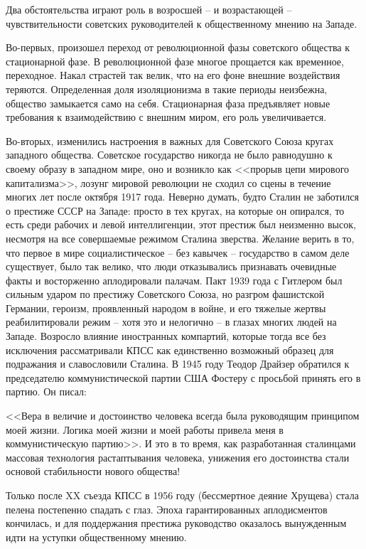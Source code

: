 \documentclass{book}
\begin{document}
Два обстоятельства играют роль в возросшей -- и возрас­тающей -- чувствительности советских руководителей к общест­венному мнению на Западе.

Во-первых, произошел переход от революционной фазы советского общества к стационарной фазе. В революционной фазе многое прощается как временное, переходное. Накал страстей так велик, что на его фоне внешние воздействия теря­ются. Определенная доля изоляционизма в такие периоды неизбежна, общество замыкается само на себя. Стационарная фаза предъявляет новые требования к взаимодействию с внеш­ним миром, его роль увеличивается.

Во-вторых, изменились настроения в важных для Советско­го Союза кругах западного общества. Советское государство никогда не было равнодушно к своему образу в западном ми­ре, оно и возникло как <<прорыв цепи мирового капитализма>>, лозунг мировой революции не сходил со сцены в течение многих лет после октября 1917 года. Неверно думать, будто Сталин не заботился о престиже СССР на Западе: просто в тех кругах, на которые он опирался, то есть среди рабочих и левой интел­лигенции, этот престиж был неизменно высок, несмотря на все совершаемые режимом Сталина зверства. Желание верить в то, что первое в мире социалистическое -- без кавычек -- го­сударство в самом деле существует, было так велико, что люди отказывались признавать очевидные факты и восторженно аплодировали палачам. Пакт 1939 года с Гитлером был силь­ным ударом по престижу Советского Союза, но разгром фа­шистской Германии, героизм, проявленный народом в войне, и его тяжелые жертвы реабилитировали режим -- хотя это и нелогично -- в глазах многих людей 
на 
Западе. Возросло вли­яние иностранных компартий, которые тогда все без исключения рассматривали КПСС как единственно возможный образец для подражания и славословили Сталина. В 1945 году Теодор Драйзер обратился к председателю коммунистической партии США Фостеру с просьбой принять его в партию. Он писал:

<<Вера в величие и достоинство человека всегда была руководящим принципом моей жизни. Логика моей жизни и моей работы привела меня в коммунистическую партию>>.%
И это в то время, как разработанная сталинцами массовая технология растаптывания человека, унижения его достоинства стали основой стабильности нового общества!

Только после XX съезда КПСС в 1956 году (бессмертное деяние Хрущева) стала пелена постепенно спадать с глаз. Эпо­ха гарантированных аплодисментов кончилась, и для поддер­жания престижа руководство оказалось вынужденным идти на уступки общественному мнению.
\end{document}
